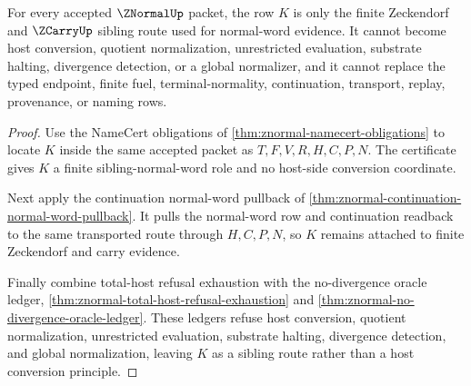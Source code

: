 \begin{theorem}
\label{thm:znormal-root-sibling-route-separation}
For every accepted $\ZNormalUp$ packet, the row $K$ is only the finite Zeckendorf and $\ZCarryUp$ sibling route used for normal-word evidence. It cannot become host conversion, quotient normalization, unrestricted evaluation, substrate halting, divergence detection, or a global normalizer, and it cannot replace the typed endpoint, finite fuel, terminal-normality, continuation, transport, replay, provenance, or naming rows.
\end{theorem}
\begin{proof}
Use the NameCert obligations of \autoref{thm:znormal-namecert-obligations} to locate $K$ inside the same accepted packet as $T,F,V,R,H,C,P,N$. The certificate gives $K$ a finite sibling-normal-word role and no host-side conversion coordinate.

Next apply the continuation normal-word pullback of \autoref{thm:znormal-continuation-normal-word-pullback}. It pulls the normal-word row and continuation readback to the same transported route through $H,C,P,N$, so $K$ remains attached to finite Zeckendorf and carry evidence.

Finally combine total-host refusal exhaustion with the no-divergence oracle ledger, \autoref{thm:znormal-total-host-refusal-exhaustion} and \autoref{thm:znormal-no-divergence-oracle-ledger}. These ledgers refuse host conversion, quotient normalization, unrestricted evaluation, substrate halting, divergence detection, and global normalization, leaving $K$ as a sibling route rather than a host conversion principle.
\end{proof}

